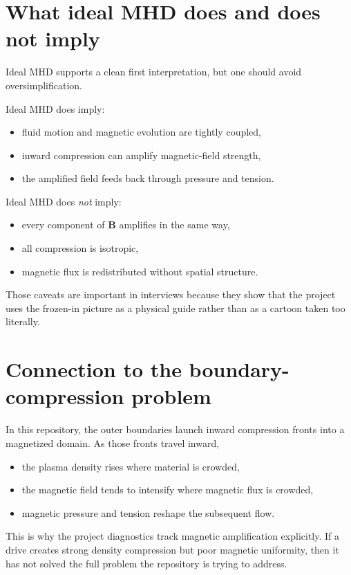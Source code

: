 \documentclass[11pt]{article}
\begin{document}
\section{What ideal MHD does and does not imply}
Ideal MHD supports a clean first interpretation, but one should avoid oversimplification.

Ideal MHD does imply:
\begin{itemize}
    \item fluid motion and magnetic evolution are tightly coupled,
    \item inward compression can amplify magnetic-field strength,
    \item the amplified field feeds back through pressure and tension.
\end{itemize}

Ideal MHD does \emph{not} imply:
\begin{itemize}
    \item every component of $\mathbf{B}$ amplifies in the same way,
    \item all compression is isotropic,
    \item magnetic flux is redistributed without spatial structure.
\end{itemize}

Those caveats are important in interviews because they show that the project uses the frozen-in picture as a physical guide rather than as a cartoon taken too literally.

\section{Connection to the boundary-compression problem}
In this repository, the outer boundaries launch inward compression fronts into a magnetized domain. As those fronts travel inward,
\begin{itemize}
    \item the plasma density rises where material is crowded,
    \item the magnetic field tends to intensify where magnetic flux is crowded,
    \item magnetic pressure and tension reshape the subsequent flow.
\end{itemize}

This is why the project diagnostics track magnetic amplification explicitly. If a drive creates strong density compression but poor magnetic uniformity, then it has not solved the full problem the repository is trying to address.
\end{document}
